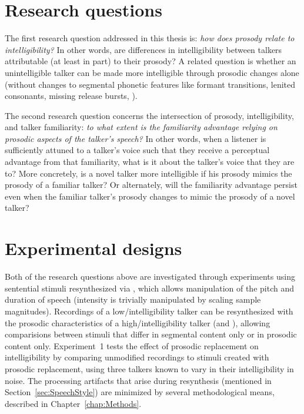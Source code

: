 \section{Research questions}
The first research question addressed in this thesis is: {\em how does prosody relate to intelligibility?}  In other words, are differences in intelligibility between talkers attributable (at least in part) to their prosody?  A related question is whether an unintelligible talker can be made more intelligible through prosodic changes alone (without changes to segmental phonetic features like formant transitions, lenited consonants, missing release bursts, \etc).


The second research question concerns the intersection of prosody, intelligibility, and talker familiarity: {\em to what extent is the familiarity advantage relying on prosodic aspects of the talker’s speech?}  In other words, when a  listener is sufficiently attuned to a talker’s voice such that they receive a perceptual advantage from that familiarity, what is it about the talker’s voice that they are  to?  More concretely, is a novel talker more intelligible if his prosody mimics the prosody of a familiar talker?  Or alternately, will the familiarity advantage persist even when the familiar talker’s prosody changes to mimic the prosody of a novel talker?

\section{Experimental designs\label{sec:ExpDesign}}
Both of the research questions above are investigated through experiments using sentential stimuli resynthesized via \psola{} \citep{MoulinesCharpentier1990}, which allows manipulation of the pitch and duration of speech (intensity is trivially manipulated by scaling sample magnitudes).  Recordings of a low\-/intelligibility talker can be resynthesized with the prosodic characteristics of a high\-/intelligibility talker (and \vv), allowing comparisions between stimuli that differ in segmental content only or in prosodic content only.  Experiment~1 tests the effect of prosodic replacement on intelligibility by comparing unmodified recordings to stimuli created with prosodic replacement, using three talkers known to vary in their intelligibility in noise.  The processing artifacts that arise during resynthesis (mentioned in Section~\ref{sec:SpeechStyle}) are minimized by several methodological means, described in Chapter~\ref{chap:Methods}. 

